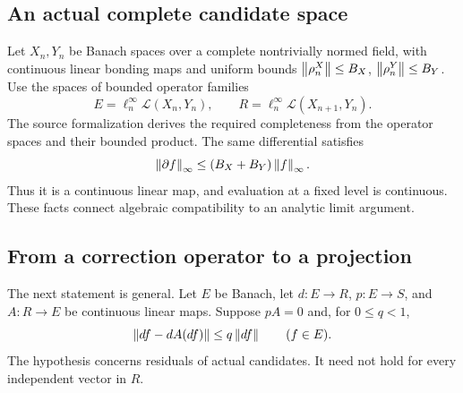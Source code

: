 \label{sec:split}
\subsection{An actual complete candidate space}
Let \(X_n,Y_n\) be Banach spaces over a complete nontrivially normed field, with continuous linear bonding maps and uniform bounds \(\left\lVert\rho^X_n\right\rVert\le B_X\), \(\left\lVert\rho^Y_n\right\rVert\le B_Y\). Use the spaces of bounded operator families
\[
 E=\ell^\infty_n\mathcal L(X_n,Y_n),\qquad
 R=\ell^\infty_n\mathcal L(X_{n+1},Y_n).
\]
The source formalization derives the required completeness from the operator spaces and their bounded product. The same differential satisfies
\[
 \left\lVert\partial f\right\rVert_\infty\le(B_X+B_Y)\left\lVert f\right\rVert_\infty.
\]
Thus it is a continuous linear map, and evaluation at a fixed level is continuous. These facts connect algebraic compatibility to an analytic limit argument.

\subsection{From a correction operator to a projection}
The next statement is general. Let \(E\) be Banach, let \(d:E\to R\), \(p:E\to S\), and \(A:R\to E\) be continuous linear maps. Suppose \(pA=0\) and, for \(0\le q<1\),
\begin{equation}\label{eq:contraction}
 \left\lVert df-dA(df)\right\rVert\le q\left\lVert df\right\rVert\qquad(f\in E).
\end{equation}
The hypothesis concerns residuals of actual candidates. It need not hold for every independent vector in \(R\).

